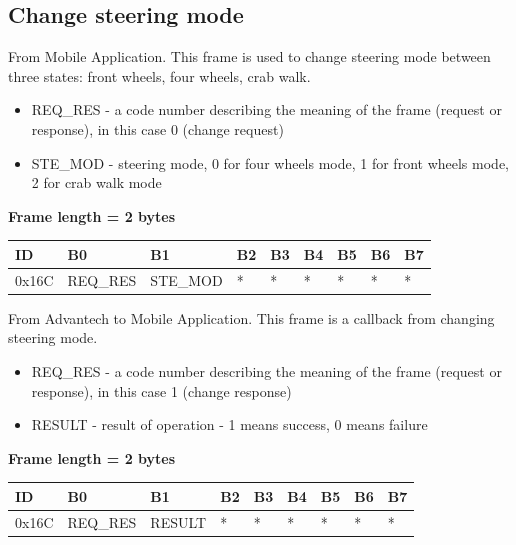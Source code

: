 \documentclass{article}
\begin{document}
\subsection{Change steering mode}
From Mobile Application. This frame is used to change steering mode between three states: front wheels, four wheels, crab walk.

\begin{itemize}
    \item REQ\_RES - a code number describing the meaning of the frame (request or response), in this case 0 (change request)
    \item STE\_MOD - steering mode, 0 for four wheels mode, 1 for front wheels mode, 2 for crab walk mode
\end{itemize}{}

\textbf{Frame length = 2 bytes}
\begin{center}
    \begin{tabular}{| p{20pt} | p{40pt} | p{40pt} | p{40pt} | p{40pt} | p{40pt} | p{40pt} | p{40pt} | p{40pt} |}
        \hline
        ID   & B0   & B1 & B2 & B3 & B4 & B5 & B6 & B7 \\
        \hline
        0x16C & REQ\_RES & STE\_MOD  & *  & *  & *  & *  & *  & *  \\
        \hline
    \end{tabular}
\end{center}

From Advantech to Mobile Application. This frame is a callback from changing steering mode.

\begin{itemize}
    \item REQ\_RES - a code number describing the meaning of the frame (request or response), in this case 1 (change response)
    \item RESULT - result of operation - 1 means success, 0 means failure
\end{itemize}{}

\textbf{Frame length = 2 bytes}
\begin{center}
    \begin{tabular}{| p{20pt} | p{40pt} | p{40pt} | p{40pt} | p{40pt} | p{40pt} | p{40pt} | p{40pt} | p{40pt} |}
        \hline
        ID   & B0   & B1 & B2 & B3 & B4 & B5 & B6 & B7 \\
        \hline
        0x16C & REQ\_RES & RESULT  & *  & *  & *  & *  & *  & *  \\
        \hline
    \end{tabular}
\end{center}
\end{document}
